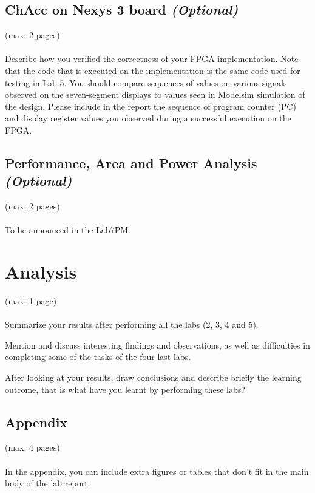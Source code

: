\documentclass[a4paper,11pt]{article}
\begin{document}
\subsection{ChAcc on Nexys 3 board \emph{(Optional)}}
(max: 2 pages)
\\\\
Describe how you verified the correctness of your FPGA implementation. Note that the code that is executed on the implementation is the same code used for testing in Lab 5. You should compare sequences of values on various signals observed on the seven-segment displays to values seen in Modelsim simulation of the design. Please include in the report the sequence of program counter (PC) and display register values you observed during a successful execution on the FPGA. 

\subsection{Performance, Area and Power Analysis \emph{(Optional)}}
(max: 2 pages)
\\\\
To be announced in the Lab7PM.

\section{Analysis}
(max: 1 page)
\\\\
Summarize your results after performing all the labs (2, 3, 4 and 5).

Mention and discuss interesting findings and observations, as well as difficulties in completing some of the tasks of the four last labs.

After looking at your results, draw conclusions and describe briefly the learning outcome, that is what have you learnt by performing these labs?  

\newpage
\begin{appendix}

\section{Appendix}
(max: 4 pages)
\\\\
In the appendix, you can include extra figures or tables that don't fit in the main body of the lab report. 

\end{appendix}
\end{document}
